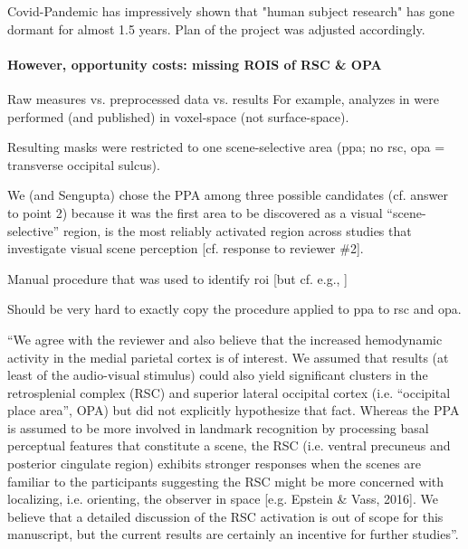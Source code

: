 


%
Covid-Pandemic has impressively shown that "human subject research" has gone
dormant for almost 1.5 years.
%
Plan of the project was adjusted accordingly.


\paragraph{However, opportunity costs: missing ROIS of RSC \& OPA}

%
Raw measures vs. preprocessed data vs. results
%
For example, analyzes in \citet{sengupta2016extension} were performed (and
published) in voxel-space (not surface-space).

%
Resulting masks were restricted to one scene-selective area (\ac{ppa}; no
\ac{rsc}, \ac{opa} = transverse occipital sulcus).

We (and Sengupta) chose the PPA among three possible candidates (cf. answer to
point 2) because it was the first area to be discovered as a visual
``scene-selective'' region, is the most reliably activated region across studies
that investigate visual scene perception [cf. response to reviewer \#2].

%
Manual procedure that was used to identify \ac{roi} [but cf. e.g.,
\citet{julian2012algorithmic}]

%
Should be very hard to exactly copy the procedure applied to \ac{ppa} to
\ac{rsc} and \ac{opa}.

``We agree with the reviewer and also believe that the increased hemodynamic
activity in the medial parietal cortex is of interest.
%
We assumed that results (at least of the audio-visual stimulus) could also yield
significant clusters in the retrosplenial complex (RSC) and superior lateral
occipital cortex (i.e. “occipital place area”, OPA) but did not explicitly
hypothesize that fact.
%
Whereas the PPA is assumed to be more involved in landmark recognition by
processing basal perceptual features that constitute a scene, the RSC (i.e.
ventral precuneus and posterior cingulate region) exhibits stronger responses
when the scenes are familiar to the participants suggesting the RSC might be
more concerned with localizing, i.e. orienting, the observer in space [e.g.
Epstein \& Vass, 2016].
%
We believe that a detailed discussion of the RSC activation is out of scope for
this manuscript, but the current results are certainly an incentive for further
studies''.

